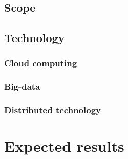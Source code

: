 \documentclass[12pt]{article}
\newcommand{\meta}[1]{{\color{blue}#1}}
\begin{document}
\subsection{Scope}\label{subsec:scope}

\subsection{Technology}\label{subsec:technology}

\meta{
\subsubsection*{Cloud computing}
\subsubsection*{Big-data}
\subsubsection*{Distributed technology}
}

\section{Expected results}\label{sec:expected-results}
\end{document}
